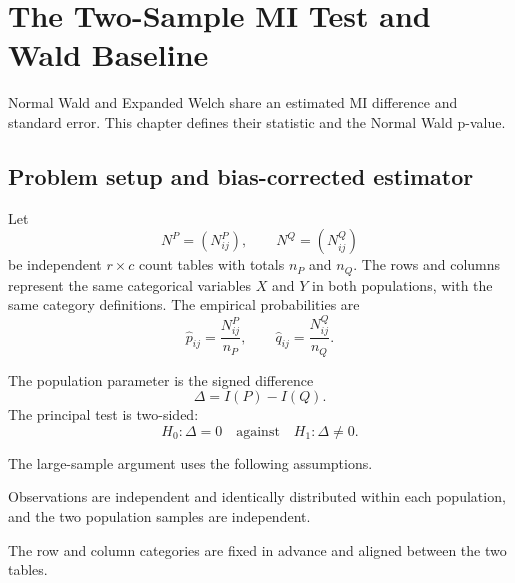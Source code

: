 \chapter{The Two-Sample MI Test and Wald Baseline}
\label{chap:baselines}

Normal Wald and Expanded Welch share an estimated MI difference and standard
error. This chapter defines their statistic and the Normal Wald p-value.

\section{Problem setup and bias-corrected estimator}

Let
\begin{equation}
  N^P=(N^P_{ij}),
  \qquad
  N^Q=(N^Q_{ij})
\end{equation}
be independent \(r\times c\) count tables with totals \(n_P\) and \(n_Q\).
The rows and columns represent the same categorical variables \(X\) and
\(Y\) in both populations, with the same category definitions.
The empirical probabilities are
\begin{equation}
  \widehat p_{ij}=\frac{N^P_{ij}}{n_P},
  \qquad
  \widehat q_{ij}=\frac{N^Q_{ij}}{n_Q}.
\end{equation}

The population parameter is the signed difference
\begin{equation}
  \Delta=I(P)-I(Q).
  \label{eq:delta-population}
\end{equation}
The principal test is two-sided:
\begin{equation}
  H_0:\Delta=0
  \quad\text{against}\quad
  H_1:\Delta\ne0.
  \label{eq:two-sample-null}
\end{equation}

The large-sample argument uses the following assumptions.

\begin{samepage}
\begin{assumption}[Sampling]
Observations are independent and identically distributed within each
population, and the two population samples are independent.
\end{assumption}
\end{samepage}

\begin{assumption}
The row and column categories are fixed in advance and aligned between the two
tables.
\end{assumption}

